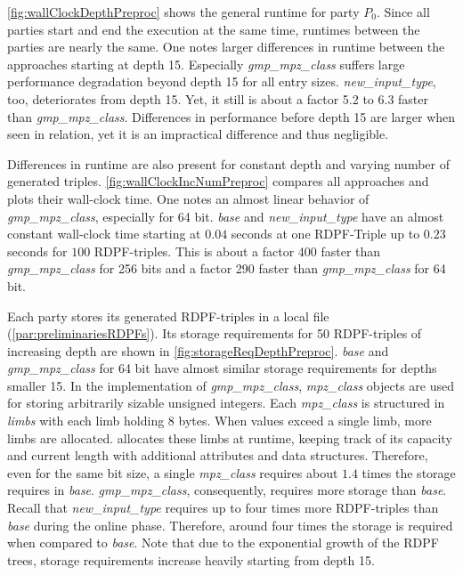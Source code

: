 \label{subsub:expPreprocBenchmarks}

\ref{fig:wallClockDepthPreproc} shows the general runtime for party $P_0$.
Since all parties start and end the execution at the same time, runtimes between the parties are nearly the same.
One notes larger differences in runtime between the approaches starting at depth 15.
Especially \textit{gmp\_mpz\_class} suffers large performance degradation beyond depth 15 for all entry sizes.
\textit{new\_input\_type}, too, deteriorates from depth 15.
Yet, it still is about a factor 5.2 to 6.3 faster than \textit{gmp\_mpz\_class}.
Differences in performance before depth 15 are larger when seen in relation, yet it is an impractical difference and thus negligible.

Differences in runtime are also present for constant depth and varying number of generated triples.
\ref{fig:wallClockIncNumPreproc} compares all approaches and plots their wall-clock time.
One notes an almost linear behavior of \textit{gmp\_mpz\_class}, especially for 64 bit.
\textit{base} and \textit{new\_input\_type} have an almost constant wall-clock time starting at $0.04$ seconds at one RDPF-Triple up to $0.23$ seconds for $100$ RDPF-triples. 
This is about a factor 400 faster than \textit{gmp\_mpz\_class} for 256 bits and a factor 290 faster than \textit{gmp\_mpz\_class} for 64 bit.

Each party stores its generated RDPF-triples in a local file (\ref{par:preliminariesRDPFs}).
Its storage requirements for 50 RDPF-triples of increasing depth are shown in \ref{fig:storageReqDepthPreproc}.
\textit{base} and \textit{gmp\_mpz\_class} for 64 bit have almost similar storage requirements for depths smaller 15.
In the implementation of \textit{gmp\_mpz\_class}, \textit{mpz\_class} objects are used for storing arbitrarily sizable unsigned integers.
Each \textit{mpz\_class} is structured in \textit{limbs} with each limb holding 8 bytes.
When values exceed a single limb, more limbs are allocated.
 allocates these limbs at runtime, keeping track of its capacity and current length with additional attributes and data structures.
Therefore, even for the same bit size, a single \textit{mpz\_class} requires about $1.4$ times the storage  requires in \textit{base}.
\textit{gmp\_mpz\_class}, consequently, requires more storage than \textit{base}.
Recall that \textit{new\_input\_type} requires up to four times more RDPF-triples than \textit{base} during the online phase.
Therefore, around four times the storage is required when compared to \textit{base}.
Note that due to the exponential growth of the RDPF trees, storage requirements increase heavily starting from depth 15.

